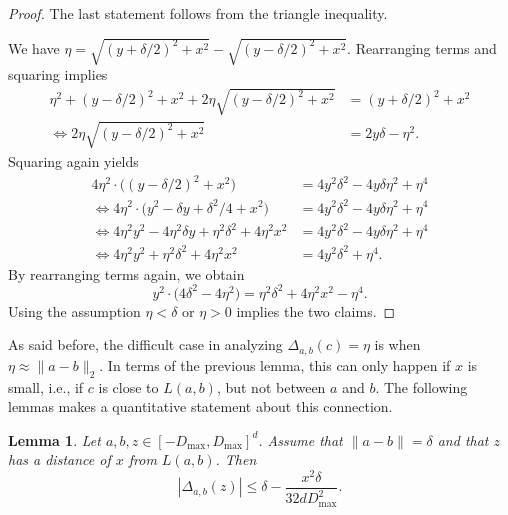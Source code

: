 \documentclass[11pt,DIV=12,a4paper]{scrartcl}
\newtheorem{lemma}[claim]{Lemma}
\newcommand{\maxx}{D_{\max}}
\begin{document}
\begin{proof}
The last statement follows from the triangle inequality.

We have $\eta = \sqrt{(y+\delta/2)^2 + x^2} - \sqrt{(y-\delta/2)^2 + x^2}$.
Rearranging terms and squaring implies
\begin{align*}
 \eta^2 + (y-\delta/2)^2 + x^2 + 2 \eta \sqrt{(y-\delta/2)^2 + x^2} & = (y+\delta/2)^2 + x^2 \\
\Leftrightarrow 
 2 \eta \sqrt{(y-\delta/2)^2 + x^2} & = 2y\delta - \eta^2.
\end{align*}
Squaring again yields
\begin{align*}
 4 \eta^2 \cdot \bigl((y-\delta/2)^2 + x^2\bigr) & = 4y^2 \delta^2 - 4y\delta \eta^2 + \eta^4 \\
 \Leftrightarrow 4 \eta^2 \cdot \bigl(y^2 - \delta y + \delta^2/4 + x^2\bigr) & = 4y^2 \delta^2 - 4y\delta \eta^2 + \eta^4 \\
 \Leftrightarrow 4 \eta^2 y^2 - 4 \eta^2 \delta y + \eta^2 \delta^2 + 4 \eta^2 x^2 & = 4y^2 \delta^2 - 4y\delta \eta^2 + \eta^4 \\
 \Leftrightarrow 4 \eta^2 y^2 + \eta^2 \delta^2 + 4 \eta^2 x^2 & = 4y^2 \delta^2 + \eta^4.
\end{align*}
By rearranging terms again, we obtain
\[
y^2 \cdot \bigl(4 \delta^2 - 4 \eta^2) = \eta^2 \delta^2 + 4 \eta^2 x^2 - \eta^4.
\]
Using the assumption $\eta < \delta$ or $\eta>0$ implies the two claims.
\end{proof}

As said before, the difficult case in analyzing $\Delta_{a,b}(c) = \eta$ is when
$\eta \approx \|a-b\|_2$. In terms of the previous lemma, this can only happen if $x$ is small, i.e.,
if $c$ is close to $L(a,b)$, but not between $a$ and $b$.
The following lemmas makes a quantitative statement about this connection.

\begin{lemma}
\label{lem:newbadcone}
Let $a, b, z \in [-\maxx, \maxx]^d$. Assume that $\|a-b\| = \delta$ and that $z$ has a distance of $x$ from
$L(a,b)$. Then
\begin{equation}
  |\Delta_{a,b}(z)| \leq \delta - \frac{x^2\delta}{32d \maxx^2} . 
\label{newbadcone}
\end{equation}
\end{lemma}
\end{document}
